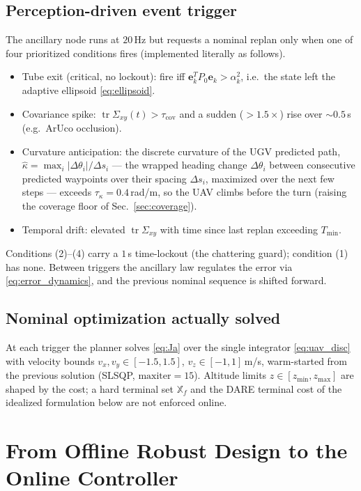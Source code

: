 \documentclass[letterpaper, 10 pt, conference]{ieeeconf}  %
\DeclareMathOperator{\tr}{tr}
\begin{document}
\subsection{Perception-driven event trigger}
\label{sec:trigger}
The ancillary node runs at $20$\,Hz but requests a nominal replan only when one of
four prioritized conditions fires (implemented literally as follows).
\begin{itemize}
\item {Tube exit (critical, no lockout):} fire iff
$\mathbf{e}_k^T P_0\mathbf{e}_k>\alpha_k^2$, i.e.\ the state left the adaptive
ellipsoid \eqref{eq:ellipsoid}.
\item {Covariance spike:} $\tr\Sigma_{xy}(t)>\tau_{\mathrm{cov}}$ and a
sudden ($>\!1.5\times$) rise over $\sim0.5$\,s (e.g.\ ArUco occlusion).
\item {Curvature anticipation:} the discrete curvature of the UGV predicted path,
$\hat\kappa=\max_i |\Delta\theta_i|/\Delta s_i$ --- the wrapped heading change $\Delta\theta_i$
between consecutive predicted waypoints over their spacing $\Delta s_i$, maximized over the next
few steps --- exceeds $\tau_\kappa=0.4$\,rad/m, so the UAV climbs before the turn (raising the
coverage floor of Sec.~\ref{sec:coverage}).
\item {Temporal drift:} elevated $\tr\Sigma_{xy}$ with time since last
replan exceeding $T_{\min}$.
\end{itemize}
Conditions (2)--(4) carry a $1$\,s time-lockout (the chattering guard);
condition (1) has none. Between triggers the ancillary law regulates the error
via \eqref{eq:error_dynamics}, and the previous nominal sequence is shifted
forward.

\subsection{Nominal optimization actually solved}
At each trigger the planner solves \eqref{eq:Ja} over the single integrator
\eqref{eq:uav_disc} with velocity bounds $v_x,v_y\in[-1.5,1.5]$,
$v_z\in[-1,1]$\,m/s, warm-started from the previous solution (SLSQP,
$\text{maxiter}=15$). Altitude limits $z\in[z_{\min},z_{\max}]$ are shaped by the
cost; a hard terminal set $\mathbb{X}_f$ and the DARE terminal cost of the
idealized formulation below are {not} enforced online.

\section{From Offline Robust Design to the Online Controller}
\label{sec:theory}
\end{document}
